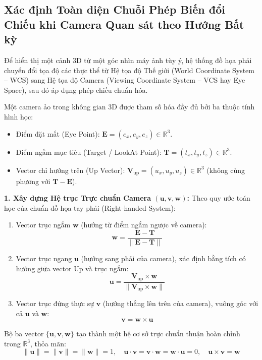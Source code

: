 \subsection{Xác định Toàn diện Chuỗi Phép Biến đổi Chiếu khi Camera Quan sát theo Hướng Bất kỳ}
\label{subsec:camera_arbitrary_viewing_pipeline}

Để hiển thị một cảnh 3D từ một góc nhìn máy ảnh tùy ý, hệ thống đồ họa phải chuyển đổi tọa độ các thực thể từ Hệ tọa độ Thế giới (World Coordinate System -- WCS) sang Hệ tọa độ Camera (Viewing Coordinate System -- VCS hay Eye Space), sau đó áp dụng phép chiếu chuẩn hóa.

Một camera ảo trong không gian 3D được tham số hóa đầy đủ bởi ba thuộc tính hình học:
\begin{itemize}
    \item Điểm đặt mắt (Eye Point): $\mathbf{E} = (e_x, e_y, e_z) \in \mathbb{R}^3$.
    \item Điểm ngắm mục tiêu (Target / LookAt Point): $\mathbf{T} = (t_x, t_y, t_z) \in \mathbb{R}^3$.
    \item Vector chỉ hướng trên (Up Vector): $\mathbf{V}_{\text{up}} = (u_x, u_y, u_z) \in \mathbb{R}^3$ (không cùng phương với $\mathbf{T} - \mathbf{E}$).
\end{itemize}

\textbf{1. Xây dựng Hệ trục Trực chuẩn Camera \texorpdfstring{$(\mathbf{u}, \mathbf{v}, \mathbf{w})$}{(u, v, w)}:}
Theo quy ước toán học của chuẩn đồ họa tay phải (Right-handed System):
\begin{enumerate}[label=\alph*)]
    \item Vector trục ngắm $\mathbf{w}$ (hướng từ điểm ngắm ngược về camera):
    \begin{equation}
    \mathbf{w} = \frac{\mathbf{E} - \mathbf{T}}{\|\mathbf{E} - \mathbf{T}\|}
    \end{equation}
    \item Vector trục ngang $\mathbf{u}$ (hướng sang phải của camera), xác định bằng tích có hướng giữa vector Up và trục ngắm:
    \begin{equation}
    \mathbf{u} = \frac{\mathbf{V}_{\text{up}} \times \mathbf{w}}{\|\mathbf{V}_{\text{up}} \times \mathbf{w}\|}
    \end{equation}
    \item Vector trục đứng thực sự $\mathbf{v}$ (hướng thẳng lên trên của camera), vuông góc với cả $\mathbf{u}$ và $\mathbf{w}$:
    \begin{equation}
    \mathbf{v} = \mathbf{w} \times \mathbf{u}
    \end{equation}
\end{enumerate}
Bộ ba vector $\{\mathbf{u}, \mathbf{v}, \mathbf{w}\}$ tạo thành một hệ cơ sở trực chuẩn thuận hoàn chỉnh trong $\mathbb{R}^3$, thỏa mãn:
\begin{equation}
\|\mathbf{u}\| = \|\mathbf{v}\| = \|\mathbf{w}\| = 1, \quad \mathbf{u} \cdot \mathbf{v} = \mathbf{v} \cdot \mathbf{w} = \mathbf{w} \cdot \mathbf{u} = 0, \quad \mathbf{u} \times \mathbf{v} = \mathbf{w}
\end{equation}

